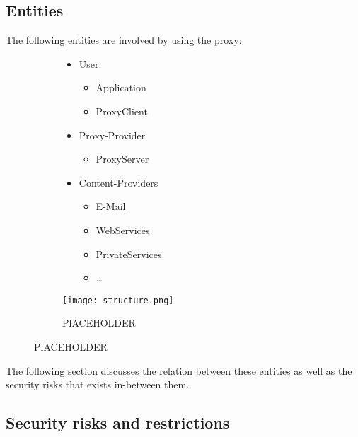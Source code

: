 \documentclass[12pt, a4paper]{scrartcl}
\begin{document}
\subsection{Entities}
The following entities are involved by using the proxy:
\begin{figure}[H]
    \centering
    \begin{subfigure}{0.45\textwidth}
        \begin{itemize}
            \item User:
            \begin{itemize}
                \item Application
                \item ProxyClient
            \end{itemize}
            \item Proxy-Provider
            \begin{itemize}
                \item ProxyServer
            \end{itemize}
            \item Content-Providers
            \begin{itemize}
                \item E-Mail
                \item WebServices
                \item PrivateServices
                \item \ldots
            \end{itemize}
        \end{itemize}
    \end{subfigure}
    \begin{subfigure}{0.5\textwidth}
        \centering
        \texttt{[image: structure.png]}
        \caption{PlACEHOLDER}
        \label{fig::enti}
    \end{subfigure}
\end{figure}

\noindent The following section discusses the relation between these entities as well as the security risks that exists in-between them.
\subsection{Security risks and restrictions}
\end{document}

